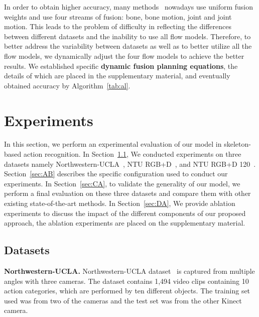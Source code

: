 \documentclass[letterpaper]{article} \usepackage[submission]{aaai23}  \usepackage{times}  \usepackage{helvet}  \usepackage{courier}  \usepackage[hyphens]{url}  \usepackage{graphicx} \urlstyle{rm} \def\UrlFont{\rm}  \usepackage{natbib}  \usepackage{caption} \frenchspacing  \setlength{\pdfpagewidth}{8.5in} \setlength{\pdfpageheight}{11in} \usepackage{algorithm}
\begin{document}
In order to obtain higher accuracy, many methods~\cite{2021Channel, 2020Skeletonshift, 2020Dynamic} nowadays use uniform fusion weights and use four streams of fusion: bone, bone motion, joint and joint motion. This leads to the problem of difficulty in reflecting the differences between different datasets and the inability to use all flow models. Therefore, to better address the variability between datasets as well as to better utilize all the flow models, we dynamically adjust the four flow models to achieve the better results. We established specific {\bf dynamic fusion planning equations}, the details of which are placed in the supplementary material, and eventually obtained accuracy by Algorithm~\ref{tab:al}.














\section{Experiments}
In this section, we perform an experimental evaluation of our model in skeleton-based action recognition. In Section~\ref{sec:AA}, We conducted experiments on three datasets namely Northwestern-UCLA~\cite{DBLP:journals/corr/WangNXWZ14}, NTU RGB+D~\cite{2016NTU}, and NTU RGB+D 120~\cite{2020NTU}. 
Section~\ref{sec:AB} describes the specific configuration used to conduct our experiments. In Section~\ref{sec:CA}, to validate the generality of our model, we perform a final evaluation on these three datasets and compare them with other existing state-of-the-art methods. In Section~\ref{sec:DA}, We provide ablation experiments to discuss the impact of the different components of our proposed approach, the ablation experiments are placed on the supplementary material. 











\subsection{Datasets}
\label{sec:AA}
\noindent
{\bf Northwestern-UCLA.} Northwestern-UCLA
dataset~\cite{DBLP:journals/corr/WangNXWZ14} is captured from multiple angles with three cameras. The dataset contains 1,494 video clips containing 10
action categories, which are performed by ten different objects. The training set used was from two of the cameras and the test set was from the other Kinect camera.
\end{document}
